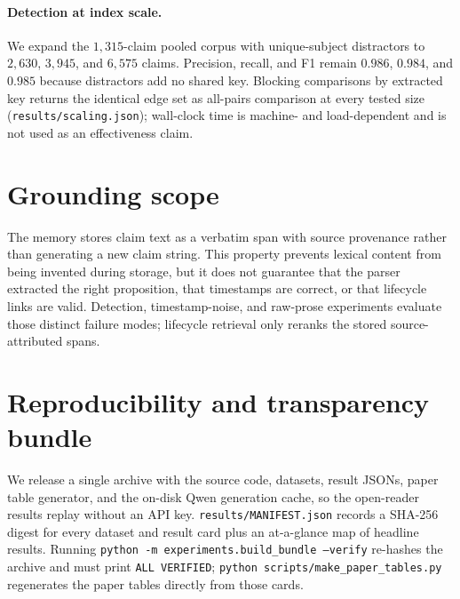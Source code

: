 \documentclass[letterpaper]{article}
\begin{document}
\paragraph{Detection at index scale.} We expand the $1{,}315$-claim pooled corpus with unique-subject distractors to $2{,}630$, $3{,}945$, and $6{,}575$ claims. Precision, recall, and F1 remain $0.986$, $0.984$, and $0.985$ because distractors add no shared key. Blocking comparisons by extracted key returns the identical edge set as all-pairs comparison at every tested size (\texttt{results/scaling.json}); wall-clock time is machine- and load-dependent and is not used as an effectiveness claim.

\section{Grounding scope}
\label{sec:supp_faithfulness}
The memory stores claim text as a verbatim span with source provenance rather than generating a new claim string. This property prevents lexical content from being invented during storage, but it does not guarantee that the parser extracted the right proposition, that timestamps are correct, or that lifecycle links are valid. Detection, timestamp-noise, and raw-prose experiments evaluate those distinct failure modes; lifecycle retrieval only reranks the stored source-attributed spans.

\section{Reproducibility and transparency bundle}
\label{sec:supp_repro}
We release a single archive with the source code, datasets, result JSONs, paper table generator, and the on-disk Qwen generation cache, so the open-reader results replay without an API key. \texttt{results/MANIFEST.json} records a SHA-256 digest for every dataset and result card plus an at-a-glance map of headline results. Running \texttt{python -m experiments.build\_bundle --verify} re-hashes the archive and must print \texttt{ALL VERIFIED}; \texttt{python scripts/make\_paper\_tables.py} regenerates the paper tables directly from those cards.
\end{document}
